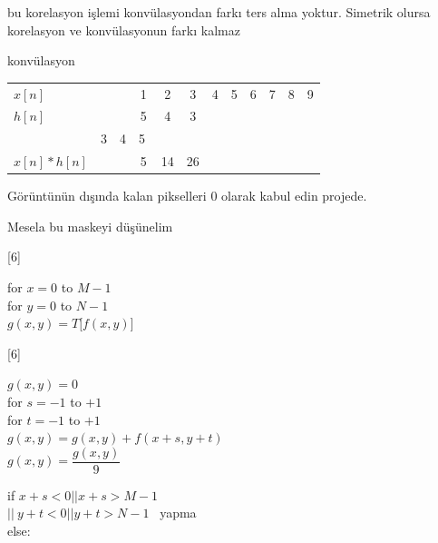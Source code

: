 \documentclass[11pt,a4paper]{article}
\begin{document}

bu korelasyon işlemi konvülasyondan farkı ters alma yoktur. Simetrik olursa korelasyon ve konvülasyonun farkı kalmaz

konvülasyon

\noindent
\begin{tabular}{@{}l *{11}{c}@{}}
$x[n]$ & & & 1 & 2 & 3 & 4 & 5 & 6 & 7 & 8 & 9 \\
$h[n]$ & & & 5 & 4 & 3 & & & & & & \\
 & {\color{turuncukalem}3} & {\color{turuncukalem}4} & {\color{turuncukalem}\textcircled{5}} & & & & & & & & \\
{\color{turuncukalem}$x[n]*h[n]$} & & & {\color{turuncukalem}5} & {\color{turuncukalem}14} & {\color{turuncukalem}26} & & & & & & \\
\end{tabular}

Görüntünün dışında kalan pikselleri 0 olarak kabul edin projede.

Mesela bu maskeyi düşünelim

[6]

\noindent for $x=0$ to $M-1$\\
\hspace*{1.5em} for $y=0$ to $N-1$\\
\hspace*{3em} $g(x,y)=T\bigl[f(x,y)\bigr]$

[6]

{\color{turuncukalem}
\noindent $g(x,y)=0$\\
for $s=-1$ to $+1$\\
\hspace*{1.5em} for $t=-1$ to $+1$\\
\hspace*{4em} $g(x,y)=g(x,y)+f(x+s,y+t)$\\
\hspace*{3em} $g(x,y)=\dfrac{g(x,y)}{9}$\par}

{\color{kirmizikalem}
\noindent if $x+s<0 \mathbin{|\!|} x+s>M-1$\\
\hspace*{3em} $\mathbin{|\!|}\ y+t<0 \mathbin{|\!|} y+t>N-1$ \ yapma\\
else:\par}

\end{document}
